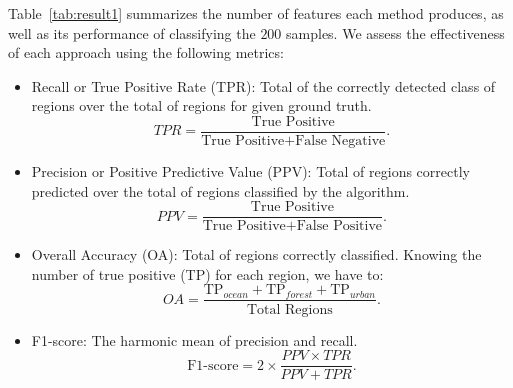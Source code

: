 \documentclass[journal]{IEEEtran}
\begin{document}
	Table~\ref{tab:result1} summarizes the number of features each method produces, as well as its performance of classifying the $200$ samples.
	We assess the effectiveness of each approach using the following metrics: 
	\begin{itemize}
		\item Recall or True Positive Rate (TPR): Total of the correctly detected class of regions over the total of regions for given ground truth.
		\begin{equation*}
		TPR = \frac{\text{True Positive}}{\text{True Positive} + \text{False Negative}}.
		\end{equation*}
		\item Precision or Positive Predictive Value (PPV): Total of regions correctly predicted over the total of regions classified by the algorithm.
		\begin{equation*}
		PPV = \frac{\text{True Positive}}{\text{True Positive} + \text{False Positive}}.
		\end{equation*}
		\item Overall Accuracy (OA): Total of regions correctly classified. 
		Knowing the number of true positive (TP) for each region, we have to:
		\begin{equation*}
		OA = \frac{\text{TP}_{ocean} + \text{TP}_{forest} + \text{TP}_{urban}}{\text{Total Regions}}.
		\end{equation*}
		\item F1-score: The harmonic mean of precision and recall.
		\begin{equation*}
		\text{F1-score} = 2 \times \frac{PPV \times TPR}{PPV + TPR}.
		\end{equation*}
	\end{itemize}
	
\end{document}
